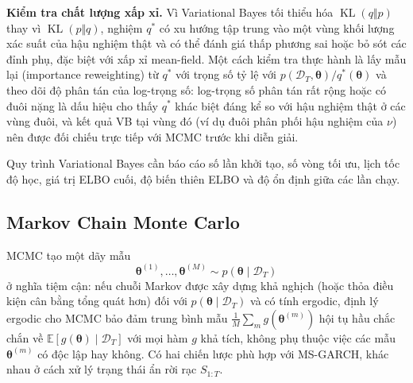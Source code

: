 \documentclass[12pt,a4paper]{article}
\numberwithin{equation}{section}
\newcommand{\bm}[1]{\symbf{#1}}
\newcommand{\Data}{\mathcal{D}}
\newcommand{\Param}{\bm{\theta}}
\newcommand{\E}{\mathbb{E}}
\newcommand{\KL}{\operatorname{KL}}
\begin{document}
\textbf{Kiểm tra chất lượng xấp xỉ.} Vì Variational Bayes tối thiểu hóa $\KL(q\Vert p)$ thay vì $\KL(p\Vert q)$, nghiệm $q^{*}$ có xu hướng tập trung vào một vùng khối lượng xác suất của hậu nghiệm thật và có thể đánh giá thấp phương sai hoặc bỏ sót các đỉnh phụ, đặc biệt với xấp xỉ mean-field. Một cách kiểm tra thực hành là lấy mẫu lại (importance reweighting) từ $q^{*}$ với trọng số tỷ lệ với $p(\Data_T,\Param)/q^{*}(\Param)$ và theo dõi độ phân tán của log-trọng số: log-trọng số phân tán rất rộng hoặc có đuôi nặng là dấu hiệu cho thấy $q^{*}$ khác biệt đáng kể so với hậu nghiệm thật ở các vùng đuôi, và kết quả VB tại vùng đó (ví dụ đuôi phân phối hậu nghiệm của $\nu$) nên được đối chiếu trực tiếp với MCMC trước khi diễn giải.

Quy trình Variational Bayes cần báo cáo số lần khởi tạo, số vòng tối ưu, lịch tốc độ học, giá trị ELBO cuối, độ biến thiên ELBO và độ ổn định giữa các lần chạy.

\subsection{Markov Chain Monte Carlo}\label{subsec:mcmc}

MCMC tạo một dãy mẫu
\begin{equation}
  {\Param}^{(1)},\ldots,{\Param}^{(M)}
  \sim p(\Param\mid\Data_T)
  \label{eq:mcmc-samples}
\end{equation}
ở nghĩa tiệm cận: nếu chuỗi Markov được xây dựng khả nghịch (hoặc thỏa điều kiện cân bằng tổng quát hơn) đối với $p(\Param\mid\Data_T)$ và có tính ergodic, định lý ergodic cho MCMC bảo đảm trung bình mẫu $\frac{1}{M}\sum_{m}g(\Param^{(m)})$ hội tụ hầu chắc chắn về $\E[g(\Param)\mid\Data_T]$ với mọi hàm $g$ khả tích, không phụ thuộc việc các mẫu $\Param^{(m)}$ có độc lập hay không. Có hai chiến lược phù hợp với MS-GARCH, khác nhau ở cách xử lý trạng thái ẩn rời rạc $S_{1:T}$.
\end{document}
